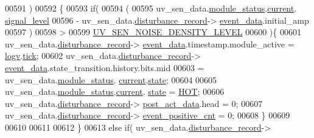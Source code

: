 \begin{DoxyCode}
00591                      )
00592                    \{
00593                           \textcolor{keywordflow}{if}(
00594                             (
00595                             uv\_sen\_data.\hyperlink{a00035_a5a53c391562b059eb744ac679f3765ca}{module\_status}.\hyperlink{a00017_ab8af48cdbba92b3ae39c4470e53af944}{current}.
      \hyperlink{a00017_abcdf2bc0c2e5a14863938ae28c3bc96e}{signal\_level}
00596                             - uv\_sen\_data.\hyperlink{a00035_ac9b38e2c1d3f1013a88d33506c754152}{disturbance\_record}->
      \hyperlink{a00028_a8c0bda69e71ef674e60da47ad0be9ab0}{event\_data}.initial\_amp
00597                             )
00598                             >
00599                             \hyperlink{a00020_a6fe600e966b9b8a62c0121805f6cbc0d}{UV\_SEN\_NOISE\_DENSITY\_LEVEL}
00600                           )\{
00601                                  uv\_sen\_data.\hyperlink{a00035_ac9b38e2c1d3f1013a88d33506c754152}{disturbance\_record}->
      \hyperlink{a00028_a8c0bda69e71ef674e60da47ad0be9ab0}{event\_data}.timestamp.module\_active = \hyperlink{a00021_a2e89c46668b39a17753c238950c9e1ec}{logv}.\hyperlink{a00021_a81f0ce68c2c483fb8df726cc1988d8e8}{tick};
00602                                  uv\_sen\_data.\hyperlink{a00035_ac9b38e2c1d3f1013a88d33506c754152}{disturbance\_record}->
      \hyperlink{a00028_a8c0bda69e71ef674e60da47ad0be9ab0}{event\_data}.state\_transition.history.bits.mid
00603                                  = uv\_sen\_data.\hyperlink{a00035_a5a53c391562b059eb744ac679f3765ca}{module\_status}.
      \hyperlink{a00017_ab8af48cdbba92b3ae39c4470e53af944}{current}.\hyperlink{a00017_a6b8d8e916bc56265a3fd279bd26b6d1b}{state};
00604 
00605                                  uv\_sen\_data.\hyperlink{a00035_a5a53c391562b059eb744ac679f3765ca}{module\_status}.\hyperlink{a00017_ab8af48cdbba92b3ae39c4470e53af944}{current}.
      \hyperlink{a00017_a6b8d8e916bc56265a3fd279bd26b6d1b}{state} = \hyperlink{a00021_a1eb14cc432874ddacd1934791dbe12a3}{HOT};
00606                                  uv\_sen\_data.\hyperlink{a00035_ac9b38e2c1d3f1013a88d33506c754152}{disturbance\_record}->
      \hyperlink{a00028_a9c699c0cc82d0baa6e49195f185ab34f}{post\_act\_data}.head = 0;
00607                                  uv\_sen\_data.\hyperlink{a00035_ac9b38e2c1d3f1013a88d33506c754152}{disturbance\_record}->
      \hyperlink{a00028_a7397b9d76d4b57500f27bb23d258a18a}{event\_positive\_cnt} = 0;
00608                            \}
00609 
00610 
00611 
00612                    \}
00613                    \textcolor{keywordflow}{else} \textcolor{keywordflow}{if}( uv\_sen\_data.\hyperlink{a00035_ac9b38e2c1d3f1013a88d33506c754152}{disturbance\_record}->

\end{DoxyCode}
